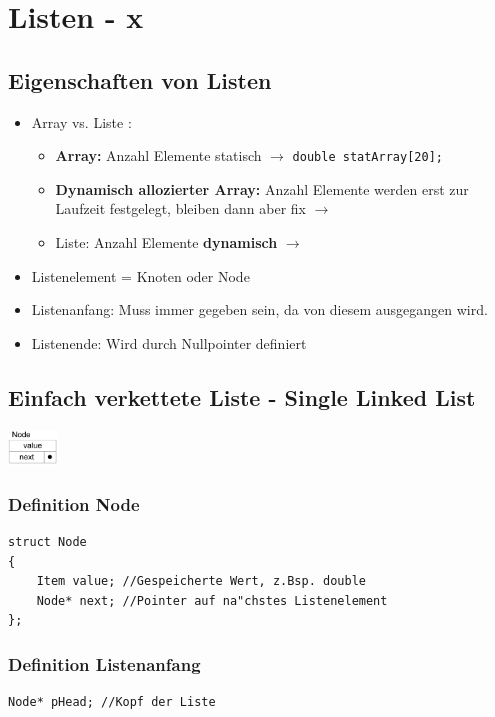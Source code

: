 \section{Listen - x}
\subsection{Eigenschaften von Listen}
\begin{itemize}
  \item Array vs. Liste :
  	\begin{itemize}
	  	\item \textbf{Array:} Anzahl Elemente statisch $\rightarrow$ \lstinline{double statArray[20];} 
	  	\item \textbf{Dynamisch allozierter Array:} Anzahl Elemente werden erst zur Laufzeit festgelegt, bleiben dann aber fix $\rightarrow$
	  	\item Liste: Anzahl Elemente \textbf{dynamisch} $\rightarrow$
  	\end{itemize}
  	
  \item Listenelement = Knoten oder Node
  \item Listenanfang: Muss immer gegeben sein, da von diesem ausgegangen wird. 
  \item Listenende: Wird durch Nullpointer definiert
\end{itemize}

\subsection{Einfach verkettete Liste - Single Linked List}
\begin{flushleft}
{\includegraphics[width=0.1\textwidth]{images/Listen/SLL.png}}
\label{Fig: Single Linked List}
\end{flushleft}
\subsubsection{Definition Node}
\begin{lstlisting}[style=C]
struct Node
{
	Item value; //Gespeicherte Wert, z.Bsp. double
	Node* next; //Pointer auf na"chstes Listenelement
};
\end{lstlisting}


\subsubsection{Definition Listenanfang}
\begin{lstlisting}[style=C]
Node* pHead; //Kopf der Liste
\end{lstlisting}

